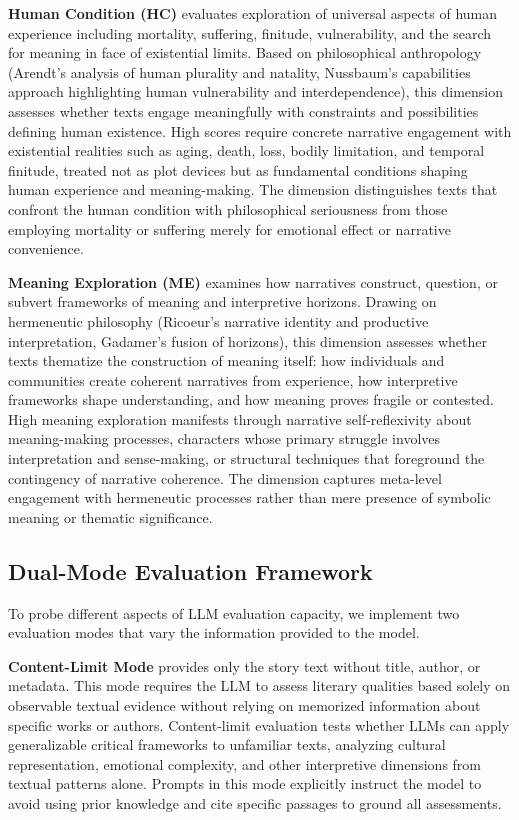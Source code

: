 \textbf{Human Condition (HC)} evaluates exploration of universal aspects of human experience including mortality, suffering, finitude, vulnerability, and the search for meaning in face of existential limits. Based on philosophical anthropology (Arendt's analysis of human plurality and natality, Nussbaum's capabilities approach highlighting human vulnerability and interdependence), this dimension assesses whether texts engage meaningfully with constraints and possibilities defining human existence. High scores require concrete narrative engagement with existential realities such as aging, death, loss, bodily limitation, and temporal finitude, treated not as plot devices but as fundamental conditions shaping human experience and meaning-making. The dimension distinguishes texts that confront the human condition with philosophical seriousness from those employing mortality or suffering merely for emotional effect or narrative convenience.

\textbf{Meaning Exploration (ME)} examines how narratives construct, question, or subvert frameworks of meaning and interpretive horizons. Drawing on hermeneutic philosophy (Ricoeur's narrative identity and productive interpretation, Gadamer's fusion of horizons), this dimension assesses whether texts thematize the construction of meaning itself: how individuals and communities create coherent narratives from experience, how interpretive frameworks shape understanding, and how meaning proves fragile or contested. High meaning exploration manifests through narrative self-reflexivity about meaning-making processes, characters whose primary struggle involves interpretation and sense-making, or structural techniques that foreground the contingency of narrative coherence. The dimension captures meta-level engagement with hermeneutic processes rather than mere presence of symbolic meaning or thematic significance.

\subsection{Dual-Mode Evaluation Framework}

To probe different aspects of LLM evaluation capacity, we implement two evaluation modes that vary the information provided to the model.

\textbf{Content-Limit Mode} provides only the story text without title, author, or metadata. This mode requires the LLM to assess literary qualities based solely on observable textual evidence without relying on memorized information about specific works or authors. Content-limit evaluation tests whether LLMs can apply generalizable critical frameworks to unfamiliar texts, analyzing cultural representation, emotional complexity, and other interpretive dimensions from textual patterns alone. Prompts in this mode explicitly instruct the model to avoid using prior knowledge and cite specific passages to ground all assessments.


